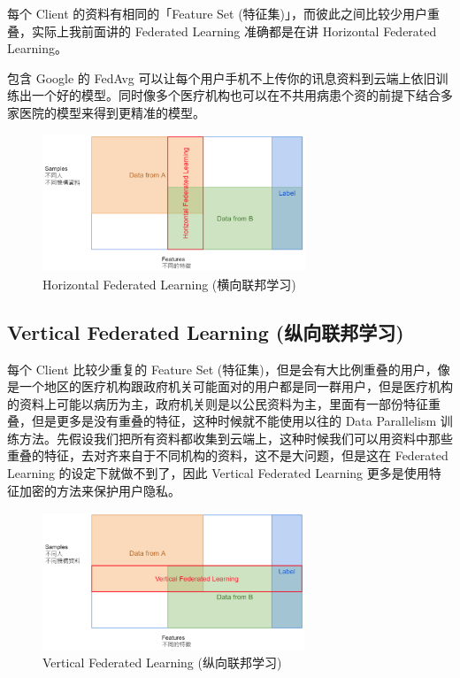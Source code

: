 每个 Client 的资料有相同的「Feature Set (特征集)」，而彼此之间比较少用户重叠，实际上我前面讲的 Federated Learning 准确都是在讲 Horizontal Federated Learning。

包含 Google 的 FedAvg 可以让每个用户手机不上传你的讯息资料到云端上依旧训练出一个好的模型。同时像多个医疗机构也可以在不共用病患个资的前提下结合多家医院的模型来得到更精准的模型。

\begin{figure}[htb]
\centering 
\includegraphics[width=0.70\textwidth]{img/newch2m3.png} 
\caption{Horizontal Federated Learning (横向联邦学习)}
\label{Test}
\end{figure}


\subsection{Vertical Federated Learning (纵向联邦学习)}

每个 Client 比较少重复的 Feature Set (特征集)，但是会有大比例重叠的用户，像是一个地区的医疗机构跟政府机关可能面对的用户都是同一群用户，但是医疗机构的资料上可能以病历为主，政府机关则是以公民资料为主，里面有一部份特征重叠，但是更多是没有重叠的特征，这种时候就不能使用以往的 Data Parallelism 训练方法。先假设我们把所有资料都收集到云端上，这种时候我们可以用资料中那些重叠的特征，去对齐来自于不同机构的资料，这不是大问题，但是这在 Federated Learning 的设定下就做不到了，因此 Vertical Federated Learning 更多是使用特征加密的方法来保护用户隐私。

\begin{figure}[htb]
\centering 
\includegraphics[width=0.70\textwidth]{img/newch2m4.png} 
\caption{Vertical Federated Learning (纵向联邦学习)}
\label{Test}
\end{figure}

